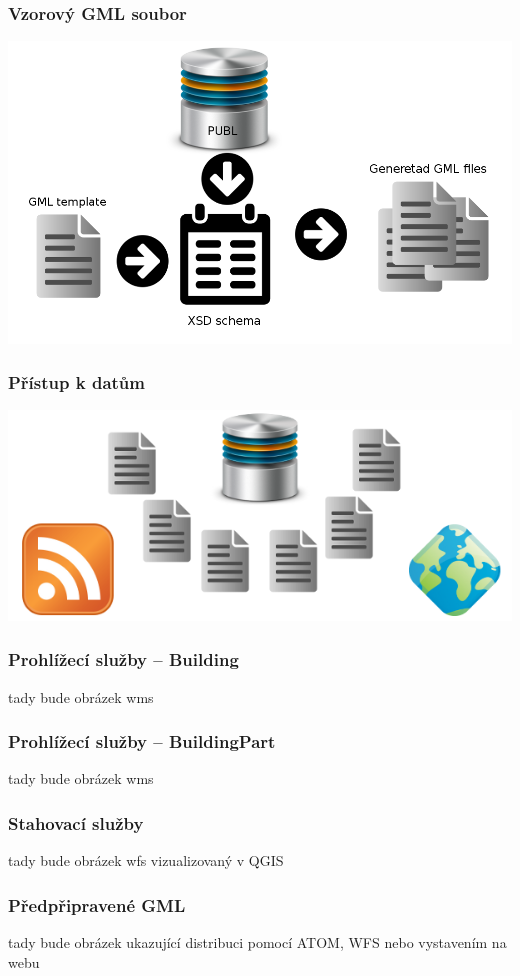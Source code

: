 \begin{frame}
\frametitle{Vzorový GML soubor}
\begin{center}
\includegraphics[scale=0.3]{obrazky/GML_sablona.png}
\end{center}
\end{frame}

\begin{frame}
\frametitle{Přístup k datům}
\begin{center}
\includegraphics[scale=0.5]{obrazky/distribuce.png}
\end{center}
\end{frame}

\begin{frame}
\frametitle{Prohlížecí služby -- Building}
\begin{center}
tady bude obrázek wms
\end{center}
\end{frame}

\begin{frame}
\frametitle{Prohlížecí služby -- BuildingPart}
\begin{center}
tady bude obrázek wms
\end{center}
\end{frame}

\begin{frame}
\frametitle{Stahovací služby}
\begin{center}
tady bude obrázek wfs vizualizovaný v QGIS
\end{center}
\end{frame}

\begin{frame}
\frametitle{Předpřipravené GML}
\begin{center}
tady bude obrázek ukazující distribuci pomocí ATOM, WFS nebo vystavením na webu
\end{center}
\end{frame}